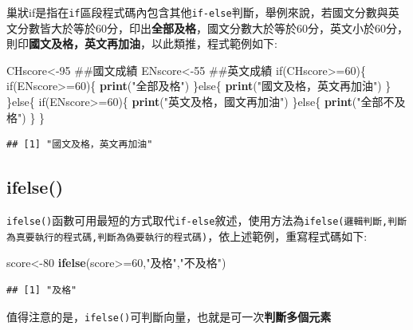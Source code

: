 \documentclass[]{book}
\newenvironment{Shaded}{\begin{snugshade}}{\end{snugshade}}
\newcommand{\KeywordTok}[1]{\textcolor[rgb]{0.13,0.29,0.53}{\textbf{{#1}}}}
\newcommand{\DecValTok}[1]{\textcolor[rgb]{0.00,0.00,0.81}{{#1}}}
\newcommand{\StringTok}[1]{\textcolor[rgb]{0.31,0.60,0.02}{{#1}}}
\newcommand{\NormalTok}[1]{{#1}}
\theoremstyle{definition}
\theoremstyle{definition}
\theoremstyle{remark}
\begin{document}
巢狀if是指在\texttt{if}區段程式碼內包含其他\texttt{if-else}判斷，舉例來說，若國文分數與英文分數皆大於等於60分，印出\textbf{全部及格}，國文分數大於等於60分，英文小於60分，則印\textbf{國文及格，英文再加油}，以此類推，程式範例如下:

\begin{Shaded}
\begin{Highlighting}[]
\NormalTok{CHscore<-}\DecValTok{95} \NormalTok{##國文成績}
\NormalTok{ENscore<-}\DecValTok{55} \NormalTok{##英文成績}
\NormalTok{if(CHscore>=}\DecValTok{60}\NormalTok{)\{}
  \NormalTok{if(ENscore>=}\DecValTok{60}\NormalTok{)\{}
    \KeywordTok{print}\NormalTok{(}\StringTok{"全部及格"}\NormalTok{)}
  \NormalTok{\}else\{}
    \KeywordTok{print}\NormalTok{(}\StringTok{"國文及格，英文再加油"}\NormalTok{)}
  \NormalTok{\}}
\NormalTok{\}else\{}
  \NormalTok{if(ENscore>=}\DecValTok{60}\NormalTok{)\{}
    \KeywordTok{print}\NormalTok{(}\StringTok{"英文及格，國文再加油"}\NormalTok{)}
  \NormalTok{\}else\{}
    \KeywordTok{print}\NormalTok{(}\StringTok{"全部不及格"}\NormalTok{)}
  \NormalTok{\}}
\NormalTok{\}}
\end{Highlighting}
\end{Shaded}

\begin{verbatim}
## [1] "國文及格，英文再加油"
\end{verbatim}

\subsection{ifelse()}\label{ifelse}

\texttt{ifelse()}函數可用最短的方式取代\texttt{if-else}敘述，使用方法為\texttt{ifelse(邏輯判斷,判斷為真要執行的程式碼,判斷為偽要執行的程式碼)}，依上述範例，重寫程式碼如下:

\begin{Shaded}
\begin{Highlighting}[]
\NormalTok{score<-}\DecValTok{80}
\KeywordTok{ifelse}\NormalTok{(score>=}\DecValTok{60}\NormalTok{,}\StringTok{"及格"}\NormalTok{,}\StringTok{"不及格"}\NormalTok{)}
\end{Highlighting}
\end{Shaded}

\begin{verbatim}
## [1] "及格"
\end{verbatim}

值得注意的是，\texttt{ifelse()}可判斷向量，也就是可一次\textbf{判斷多個元素}
\end{document}

